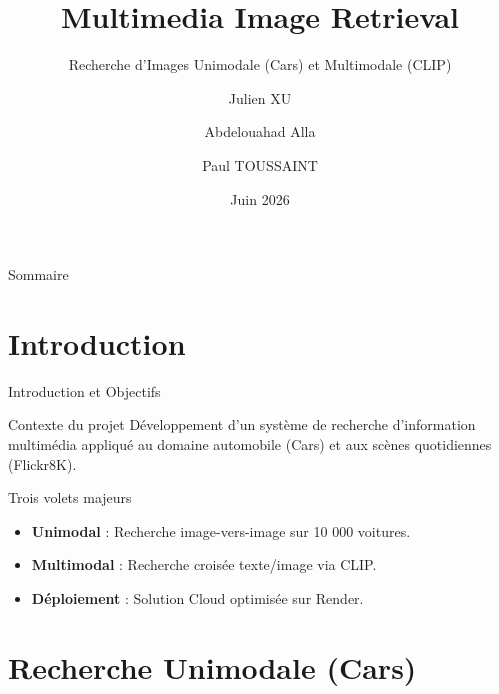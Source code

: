 \documentclass[aspectratio=169]{beamer}
\title{Multimedia Image Retrieval}
\subtitle{Recherche d’Images Unimodale (Cars) et Multimodale (CLIP)}
\author[Alla, Xu, Toussaint]{Julien XU \and Abdelouahad Alla \and Paul TOUSSAINT}
\institute[UMONS]{University of Mons \\ Faculté Polytechnique \\ Faculté des Sciences}
\date{Juin 2026}
\begin{document}
\begin{frame}[plain]
    \titlepage
\end{frame}

\begin{frame}{Sommaire}
    \tableofcontents
\end{frame}

\section{Introduction}

\begin{frame}{Introduction et Objectifs}
    \begin{block}{Contexte du projet}
        Développement d'un système de recherche d'information multimédia appliqué au domaine automobile (Cars) et aux scènes quotidiennes (Flickr8K).
    \end{block}
    
    \begin{block}{Trois volets majeurs}
        \begin{itemize}
            \item \textbf{Unimodal} : Recherche image-vers-image sur 10 000 voitures.
            \item \textbf{Multimodal} : Recherche croisée texte/image via CLIP.
            \item \textbf{Déploiement} : Solution Cloud optimisée sur Render.
        \end{itemize}
    \end{block}
\end{frame}

\section{Recherche Unimodale (Cars)}
\end{document}
